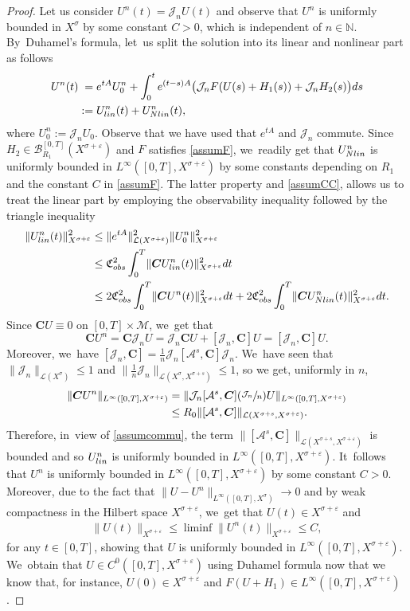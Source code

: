 \documentclass[11pt]{article}
\newcommand{\Psfrac}[2]{(\sfrac{#1}{#2})}
\newcommand{\lin}{\textup{lin}}
\newcommand{\Nlin}{\textup{Nlin}}
\theoremstyle{definition}
\let\mc\mathcal
\let\veps\varepsilon
\newcommand{\A}{\mc{A}}
\newcommand{\B}{\mc{B}}
\newcommand{\J}{\mc{J}}
\newcommand{\M}{\mc{M}}
\newcommand{\N}{\mathbb{N}}
\newcommand{\bC}{\boldsymbol{C}}
\providecommand{\norm}[1]{\lVert#1\rVert}
\begin{document}
\begin{proof}
Let us consider $U^n(t)=\J_nU(t)$ and observe that $U^n$ is uniformly bounded in $X^\sigma$ by some constant $C>0$, which is independent of $n\in \N$. By~Duhamel's formula, let~us split the solution into its linear and nonlinear part as follows
\begin{align*}
U^n(t)&\hphantom{:}=e^{tA}U_0^n+\int_0^t e^{(t-s)A}\big(\J_nF(U(s)+H_1(s))+\J_nH_2(s)\big)ds\\ &:=U_{\lin}^n(t)+U_{\Nlin}^n(t),
\end{align*}
where $U_0^n:=\J_n U_0$. Observe that we have used that $e^{tA}$ and $\J_n$ commute. Since \hbox{$H_2\in \B_{R_{1}}^{[0, T]}(X^{\sigma+\veps})$} and $F$ satisfies \cref{assumF}, we~readily get that $U_{\Nlin}^n$ is uniformly bounded in $L^\infty([0, T], X^{\sigma+\veps})$ by some constants depending on $R_{1}$ and the constant $C$ in \cref{assumF}. The latter property and \cref{assumCC}, allows us to treat the linear part by employing the observability inequality followed by the triangle inequality
\begin{align*}
\norm{U_{\lin}^n(t)}_{X^{\sigma+\veps}}^2&\leq \norm{e^{tA}}_{\mc{L}(X^{\sigma+\veps})}^2 \norm{U_0^n}_{X^{\sigma+\veps}}^2\\
&\leq \mathfrak{C}_{\textup{obs}}^2\int_0^T \norm{\bC U_{\lin}^n(t)}_{X^{\sigma+\veps}}^2dt\\
&\leq 2\mathfrak{C}_{\textup{obs}}^2\int_0^T \norm{\bC U^n(t)}_{X^{\sigma+\veps}}^2dt+2\mathfrak{C}_{\textup{obs}}^2\int_0^T \norm{\bC U_{\Nlin}^n(t)}_{X^{\sigma+\veps}}^2dt.
\end{align*}
Since $\bC U\equiv 0$ on $[0, T]\times \M$, we~get that
\[
\bC U^n=\bC\mc{J}_n U=\mc{J}_n\bC U+[\mc{J}_n,\bC]U=[\mc{J}_n,\bC]U.
\]
Moreover, we~have $[\mc{J}_n,\bC]=\frac{1}{n}\mc{J}_n[\A^s,\bC]\mc{J}_n$. We~have seen that $\norm{\mc{J}_n}_{\mc{L}(X^\sigma)}\leq 1$ and $\norm{\frac{1}{n}\mc{J}_n}_{\mc{L}(X^{\sigma}, X^{\sigma+s})}\leq 1$, so we get, uniformly in $n$,
\begin{align*}
\norm{\bC U^n}_{L^\infty([0, T], X^{\sigma+\veps})}&=\norm{\mc{J}_n[\A^s,\bC]\Psfrac{\mc{J}_n}{n} U}_{L^\infty([0, T], X^{\sigma+\veps})}\\
&\leq R_0\norm{[\A^s,\bC]}_{\mc{L}(X^{\sigma+s}, X^{\sigma+\veps})}.
\end{align*}
Therefore, in~view of \cref{assumcommu}, the term $\norm{[\A^s,\bC]}_{\mc{L}(X^{\sigma+s}, X^{\sigma+\veps})}$ is bounded and so $U_{\lin}^n$ is uniformly bounded in $L^\infty([0, T], X^{\sigma+\veps})$. It~follows that $U^n$ is uniformly bounded in $L^\infty([0, T], X^{\sigma+\veps})$ by some constant $C>0$. Moreover, due to the fact that $\norm{U-U^n}_{L^\infty([0, T], X^\sigma)}\to 0$ and by weak compactness in the Hilbert space $X^{\sigma+\veps}$, we~get that $U(t)\in X^{\sigma+\veps}$ and
\begin{align*}
\norm{U(t)}_{X^{\sigma+\veps}}\leq \liminf \norm{U^n(t)}_{X^{\sigma+\veps}}\leq C,
\end{align*}
for any $t\in [0, T]$, showing that $U$ is uniformly bounded in $L^\infty([0, T], X^{\sigma+\veps})$. We~obtain that $U\in C^0([0, T], X^{\sigma+\veps})$ using Duhamel formula now that we know that, for instance, $U(0)\in X^{\sigma+\veps}$ and $F(U+H_1)\in L^\infty([0, T], X^{\sigma+\veps})$.
\end{proof}
\end{document}
